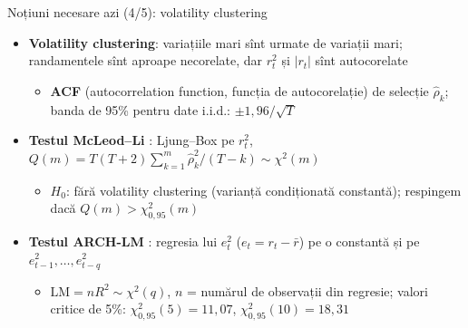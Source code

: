 \begin{frame}{Noțiuni necesare azi (4/5): volatility clustering}
\itemsize{\small}
\begin{itemize}
    \item \textbf{Volatility clustering}: variațiile mari sînt urmate de variații mari; randamentele sînt aproape necorelate, dar $r_t^2$ și $|r_t|$ sînt autocorelate
    \begin{itemize}
        \item \textbf{ACF} (autocorrelation function, funcția de autocorelație) de selecție $\hat\rho_k$; banda de 95\% pentru date i.i.d.: $\pm 1{,}96/\sqrt{T}$
    \end{itemize}
    \item \textbf{Testul McLeod--Li} : Ljung--Box  pe $r_t^2$, $Q(m) = T(T+2)\sum_{k=1}^m \hat\rho_k^2/(T-k) \sim \chi^2(m)$
    \begin{itemize}
        \item $H_0$: fără volatility clustering (varianță condiționată constantă); respingem dacă $Q(m) > \chi^2_{0{,}95}(m)$
    \end{itemize}
    \item \textbf{Testul ARCH-LM} : regresia lui $e_t^2$ ($e_t = r_t - \bar r$) pe o constantă și pe $e_{t-1}^2, \dots, e_{t-q}^2$
    \begin{itemize}
        \item $\mathrm{LM} = nR^2 \sim \chi^2(q)$, $n$ = numărul de observații din regresie; valori critice de 5\%: $\chi^2_{0{,}95}(5) = 11{,}07$, $\chi^2_{0{,}95}(10) = 18{,}31$
    \end{itemize}
\end{itemize}
\end{frame}

